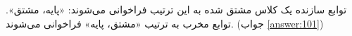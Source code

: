 \section{}
\paragraph{}\label{hint:142}
توابع سازنده یک کلاس مشتق شده به این ترتیب فراخوانی می‌شوند: «پایه، مشتق». توابع مخرب به ترتیب «مشتق، پایه» فراخوانی می‌شوند. (جواب \ref{answer:101})